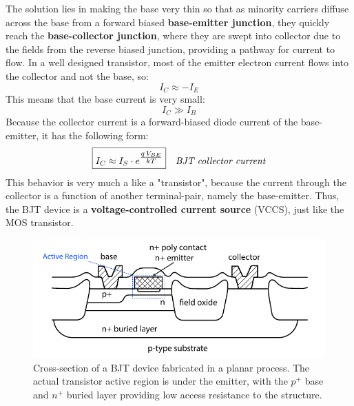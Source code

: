 The solution lies in making the base very thin so that as minority carriers diffuse across the base from a forward biased \textbf{base-emitter junction}, they quickly reach the \textbf{base-collector junction}, where they are swept into collector due to the fields from the reverse biased junction, providing a pathway for current to flow.  In a well designed transistor, most of the emitter electron current flows into the collector and not the base, so:
    \begin{equation}
        I_C \approx -I_E
    \end{equation}
This means that the base current is very small:
    \begin{equation}
        I_C \gg I_B
    \end{equation}
Because the collector current is a forward-biased diode current of the base-emitter, it has the following form:
    \begin{align}
        \Aboxed{I_C &\approx I_S \cdot e^{\mathlarger{\frac{q\,V_{BE}}{kT}}}} &\textit{BJT collector current}
    \end{align}
This behavior is very much a like a "transistor", because the current through the collector is a function of another terminal-pair, namely the base-emitter.  Thus, the BJT device is a \textbf{voltage-controlled current source} (VCCS), just like the MOS transistor.
\newpage
\begin{figure}[t]
\centering
\includegraphics[width=.95\columnwidth]{slide3_bjtcross}
\caption{Cross-section of a BJT device fabricated in a planar process.  The actual transistor active region is under the emitter, with the $p^+$ base and $n^+$ buried layer providing low access resistance to the structure.}
\label{fig:slide3_bjtcross}
\end{figure}
